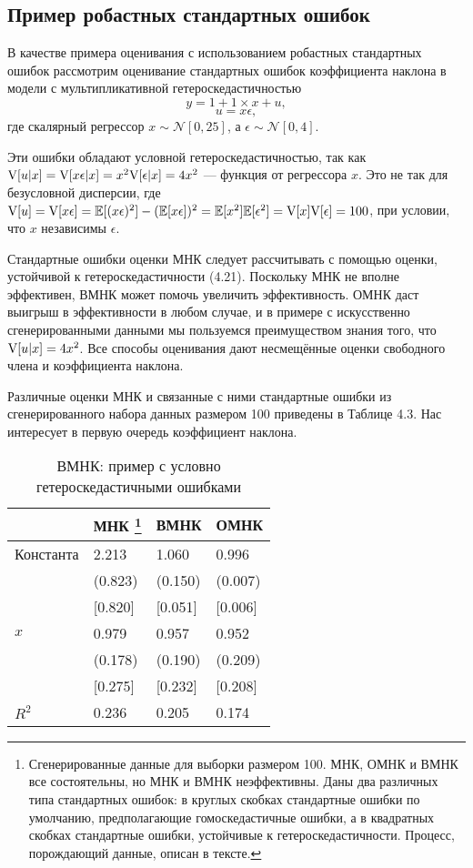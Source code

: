 \subsection{Пример робастных стандартных ошибок}

В качестве примера оценивания с использованием робастных стандартных ошибок рассмотрим оценивание стандартных ошибок коэффициента наклона в модели с мультипликативной гетероскедастичностью
$$
y = 1 + 1\times x +u,
$$
$$
u = x\epsilon,
$$
где скалярный регрессор $x \sim \mathcal{N} [0, 25]$, а $\epsilon\sim \mathcal{N} [0, 4]$.

Эти ошибки обладают условной гетероскедастичностью, так как $\mathrm{V} [u|x] = \mathrm{V} [x\epsilon | x] = x^2\mathrm{V}[\epsilon|x] = 4x^2$ --- функция от регрессора $x$. Это не так для безусловной дисперсии, где $\mathrm{V}[u] = \mathrm{V}[x\epsilon] = \mathbb{E}[(x\epsilon)^2]-(\mathbb{E}[x\epsilon])^2 = \mathbb{E}[x^2] \mathbb{E}[\epsilon^2] = \mathrm{V}[x] \mathrm{V}[\epsilon] = 100$, при условии, что $x$ независимы $\epsilon$.

Стандартные ошибки оценки МНК следует рассчитывать с помощью оценки, устойчивой к гетероскедастичности (4.21). Поскольку МНК не вполне эффективен, ВМНК может помочь увеличить эффективность. ОМНК даст выигрыш в эффективности в любом случае, и в примере с искусственно сгенерированными данными мы пользуемся преимуществом знания того, что $\mathrm{V} [u|x] = 4x^2$. Все способы оценивания дают несмещённые оценки свободного члена и коэффициента наклона.

Различные оценки МНК и связанные с ними стандартные ошибки из сгенерированного набора данных размером 100 приведены в Таблице 4.3. Нас интересует в первую очередь коэффициент наклона.

\begin{table}[h]
\caption{\label{tab:wls} ВМНК: пример с условно гетероскедастичными ошибками}
\begin{minipage}{\textwidth}
\begin{tabular}[t]{llll}
\hline
\hline
 & \bf{МНК}  \footnote{Сгенерированные данные для выборки размером 100. МНК, ОМНК и ВМНК все состоятельны, но МНК и ВМНК неэффективны. Даны два различных типа стандартных ошибок: в круглых скобках стандартные ошибки по умолчанию, предполагающие гомоскедастичные ошибки, а в квадратных скобках стандартные ошибки, устойчивые к гетероскедастичности. Процесс, порождающий данные, описан в тексте.} & \bf{ВМНК} & \bf{ОМНК}  \\
\hline
    Константа & 2.213 & 1.060  & 0.996 \\
          & (0.823) & (0.150) & (0.007) \\
          & [0.820] & [0.051] & [0.006] \\
    $x$ & 0.979 & 0.957 & 0.952 \\
          & (0.178) & (0.190) & (0.209) \\
          & [0.275] & [0.232] & [0.208] \\
    $R^2$ & 0.236 & 0.205 & 0.174 \\

\hline
\hline
\end{tabular}
\end{minipage}
\end{table}


